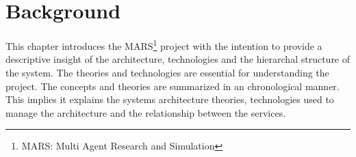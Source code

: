 \newpage
\chapter{Background}
	
This chapter introduces the MARS\footnote{MARS: Multi Agent Research and Simulation} project with the intention to provide a descriptive insight
of the architecture, technologies and the hierarchal structure of the system. The theories and
technologies are essential for understanding the project. The concepts and theories are summarized
in an chronological manner. This implies it explains the systems architecture theories,
technologies used to manage the architecture and the relationship between the services.

	
	
	